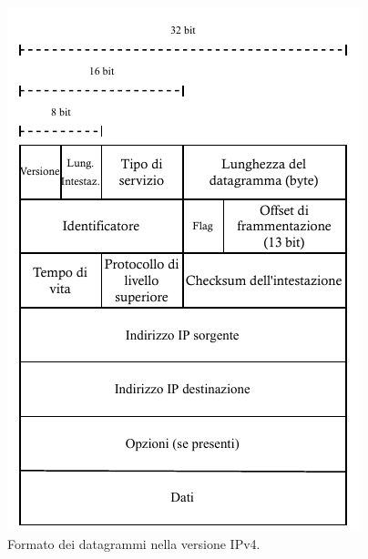 \documentclass[a4paper]{article}
\begin{document}
	\begin{figure}[!htp]
		\centering
		\includegraphics[width=.85\textwidth]{img/datagrammi_ipv4.pdf}
		\caption{Formato dei datagrammi nella versione IPv4.}
	\end{figure}
\end{document}
